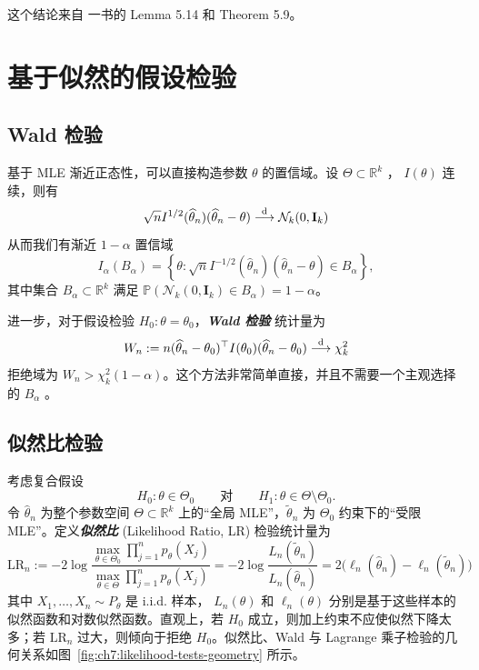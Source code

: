这个结论来自 \cite{bijma2017} 一书的 Lemma 5.14 和 Theorem 5.9。
\section{基于似然的假设检验}

\subsection{Wald 检验}\label{sec:ch7:wald-test}

基于 MLE 渐近正态性，可以直接构造参数 $\theta$ 的置信域。设 $\Theta\subset\mathbb R^k$ ， $I(\theta)$ 连续，则有
\[\sqrt{n}I^{1/2}(\widehat{\theta}_n)(\widehat{\theta}_n - \theta) \overset{\rm d}\longrightarrow \mathcal{N}_k(0, \mathbf I_k)\]
从而我们有渐近 $1-\alpha$ 置信域
\[I_\alpha(B_\alpha) = \left\{ \theta : \sqrt{n} I^{-1/2}(\widehat{\theta}_n)(\widehat{\theta}_n - \theta) \in B_\alpha \right\},\]
其中集合 $B_\alpha \subset \mathbb{R}^k$ 满足 $\mathbb{P}(\mathcal{N}_k(0, \mathbf I_k) \in B_\alpha) = 1-\alpha$。

进一步，对于假设检验 $H_0: \theta = \theta_0$，\textbf{\emph{Wald 检验}} 统计量为
\[W_n := n (\widehat{\theta}_n - \theta_0)^\top I(\theta_0) (\widehat{\theta}_n - \theta_0) \overset{\rm d}\longrightarrow \chi^2_k\]
拒绝域为 $W_n > \chi^2_k(1-\alpha)$。这个方法非常简单直接，并且不需要一个主观选择的 $B_\alpha$ 。

\subsection{似然比检验}

考虑复合假设
\[
H_0:\theta\in\Theta_0
\qquad\text{对}\qquad
H_1:\theta\in\Theta\setminus\Theta_0.
\]
令 $\widehat{\theta}_n$ 为整个参数空间 $\Theta\subset\mathbb R^k$ 上的``全局 MLE''，$\widetilde{\theta}_n$ 为 $\Theta_0$ 约束下的``受限 MLE''。定义\textbf{\emph{似然比}} (Likelihood Ratio, LR) 检验统计量为
\[\mathrm{LR}_n :=-2\log\frac{\max_{\theta\in\Theta_0 }\prod_{j=1}^np_{\theta}(X_j)}{\max_{\theta\in\Theta}\prod_{j=1}^np_{\theta}(X_j)}= -2 \log \frac{L_n(\widetilde{\theta}_n)}{L_n(\widehat{\theta}_n)} = 2 \big( \ell_n(\widehat{\theta}_n) - \ell_n(\widetilde{\theta}_n) \big)\]
其中 $X_1,\dots,X_n\sim P_\theta$ 是 i.i.d. 样本， $L_n(\theta)$ 和 $\ell_n(\theta)$ 分别是基于这些样本的似然函数和对数似然函数。直观上，若 $H_0$ 成立，则加上约束不应使似然下降太多；若 $\mathrm{LR}_n$ 过大，则倾向于拒绝 $H_0$。似然比、Wald 与 Lagrange 乘子检验的几何关系如图~\ref{fig:ch7:likelihood-tests-geometry} 所示。

